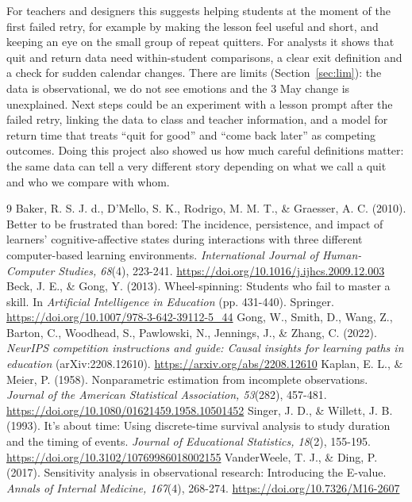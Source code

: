 \documentclass[11pt,a4paper]{article}
\begin{document}
For teachers and designers this suggests helping students at the moment of the first failed retry, for example by making the lesson feel useful and short, and keeping an eye on the small group of repeat quitters. For analysts it shows that quit and return data need within-student comparisons, a clear exit definition and a check for sudden calendar changes. There are limits (Section~\ref{sec:lim}): the data is observational, we do not see emotions and the 3 May change is unexplained. Next steps could be an experiment with a lesson prompt after the failed retry, linking the data to class and teacher information, and a model for return time that treats ``quit for good'' and ``come back later'' as competing outcomes. Doing this project also showed us how much careful definitions matter: the same data can tell a very different story depending on what we call a quit and who we compare with whom.

\begingroup\small
\begin{thebibliography}{9}
 Baker, R. S. J. d., D'Mello, S. K., Rodrigo, M. M. T., \& Graesser, A. C. (2010). Better to be frustrated than bored: The incidence, persistence, and impact of learners' cognitive-affective states during interactions with three different computer-based learning environments. \emph{International Journal of Human-Computer Studies, 68}(4), 223-241. \url{https://doi.org/10.1016/j.ijhcs.2009.12.003}
 Beck, J. E., \& Gong, Y. (2013). Wheel-spinning: Students who fail to master a skill. In \emph{Artificial Intelligence in Education} (pp. 431-440). Springer. \url{https://doi.org/10.1007/978-3-642-39112-5_44}
 Gong, W., Smith, D., Wang, Z., Barton, C., Woodhead, S., Pawlowski, N., Jennings, J., \& Zhang, C. (2022). \emph{NeurIPS competition instructions and guide: Causal insights for learning paths in education} (arXiv:2208.12610). \url{https://arxiv.org/abs/2208.12610}
 Kaplan, E. L., \& Meier, P. (1958). Nonparametric estimation from incomplete observations. \emph{Journal of the American Statistical Association, 53}(282), 457-481. \url{https://doi.org/10.1080/01621459.1958.10501452}
 Singer, J. D., \& Willett, J. B. (1993). It's about time: Using discrete-time survival analysis to study duration and the timing of events. \emph{Journal of Educational Statistics, 18}(2), 155-195. \url{https://doi.org/10.3102/10769986018002155}
 VanderWeele, T. J., \& Ding, P. (2017). Sensitivity analysis in observational research: Introducing the E-value. \emph{Annals of Internal Medicine, 167}(4), 268-274. \url{https://doi.org/10.7326/M16-2607}
\end{thebibliography}
\endgroup
\end{document}
